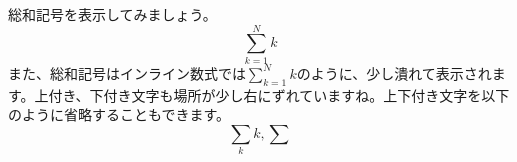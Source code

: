 \documentclass{ltjsarticle}
\begin{document}
総和記号を表示してみましょう。
\[ \sum_{k=1}^{N} k \]
また、総和記号はインライン数式では$\sum_{k=1}^{N}k$のように、少し潰れて表示されます。上付き、下付き文字も場所が少し右にずれていますね。上下付き文字を以下のように省略することもできます。
\[ \sum_{k}k, \sum \]
\end{document}
